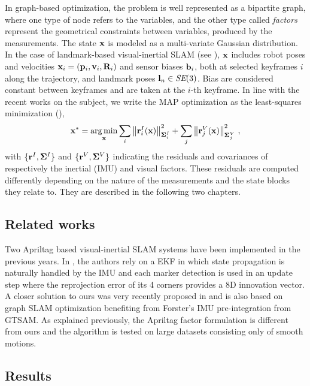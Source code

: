 In graph-based optimization, the problem is well represented as a bipartite graph, where one type of node refers to the variables, 
and the other type called \emph{factors} represent the geometrical constraints between variables, produced by the measurements.
%
The state ${\bf x}$ is modeled as a multi-variate Gaussian distribution.
In the case of landmark-based visual-inertial SLAM (see ), ${\bf x}$ includes robot poses and velocities 
${\bf x}_i=({\bf p}_i,{\bf v}_i,{\bf R}_i)$ and sensor biases ${\bf b}_i$, both at selected keyframes $i$ along the trajectory, and landmark poses ${\bf l}_n\in\textit{SE}(3)$.
Bias are considered constant between keyframes and are taken at the $i$-th keyframe.
%
In line with the recent works on the subject, we write the MAP optimization as the least-squares minimization (),
%
\begin{align}\label{equ:least_squares}
    {\bf x}^* = \operatorname*{arg\,min}_{\bf x} 
    \sum_i {\left\|{\bf r}^I_i({\bf x})\right\|}_{{\bm \Sigma}^I_i}^2
    +
    \sum_j {\left\|{\bf r}^V_j({\bf x})\right\|}_{{\bm \Sigma}^V_j}^2
~,
\end{align}
%
with $\{{\bf r}^I,{\bm \Sigma}^I\}$ and $\{{\bf r}^V,{\bm \Sigma}^V\}$ indicating the residuals and covariances of respectively the inertial (IMU) and visual factors.
These residuals are computed differently depending on the nature of the measurements and the state blocks they relate to. 
They are described in the following two chapters.




\subsection{Related works}
Two Apriltag based visual-inertial SLAM systems have been implemented in the previous years. 
In \cite{neunert2016open}, the authors rely on a EKF in which state propagation is naturally 
handled by the IMU and each marker detection is used in an update step where the reprojection error of its 4 corners provides a 8D innovation vector. 
A closer solution to ours was very recently proposed in \cite{he2019lightweight} and is also based on graph SLAM optimization benefiting from 
Forster's IMU pre-integration from GTSAM. As explained previously, the Apriltag factor formulation is different from ours and the algorithm is tested 
on large datasets consisting only of smooth motions.


\subsection{Results}

